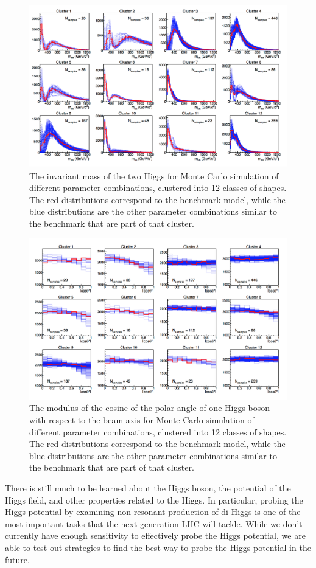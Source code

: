 \begin{figure}[h]
\centering
\includegraphics[scale=0.4]{F2/MHHClusters.png}
\caption{The invariant mass of the two Higgs for Monte Carlo simulation of different parameter combinations, clustered into 12 classes of shapes. The red distributions correspond to the benchmark model, while the blue distributions are the other parameter combinations similar to the benchmark that are part of that cluster.}
\label{Fig:MHHClusters}
\end{figure}

\begin{figure}[h]
\centering
\includegraphics[scale=0.4]{F2/CosClusters.png}
\caption{The modulus of the cosine of the polar angle of one Higgs boson with respect to the beam axis for Monte Carlo simulation of different parameter combinations, clustered into 12 classes of shapes. The red distributions correspond to the benchmark model, while the blue distributions are the other parameter combinations similar to the benchmark that are part of that cluster.}
\label{Fig:CosClusters}
\end{figure}

There is still much to be learned about the Higgs boson, the potential of the Higgs field, and other properties related to the Higgs. In particular, probing the Higgs potential by examining non-resonant production of di-Higgs is one of the most important tasks that the next generation LHC will tackle. While we don't currently have enough sensitivity to effectively probe the Higgs potential, we are able to test out strategies to find the best way to probe the Higgs potential in the future. 
